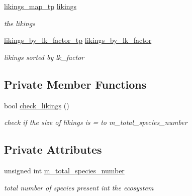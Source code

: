 \begin{DoxyCompactItemize}
\hyperlink{structSpeciesInfo_aa70735bd441c2465b36bef55cfabb1bf}{likings\_\-map\_\-tp} \hyperlink{structSpeciesInfo_a109b3e5acaf126bb8df9648b6c925542}{likings}
\begin{DoxyCompactList}\small\item\em the likings \end{DoxyCompactList}\item 
\hyperlink{structSpeciesInfo_aab6fabec09f9eb5a26e680d1d6f9d037}{likings\_\-by\_\-lk\_\-factor\_\-tp} \hyperlink{structSpeciesInfo_aa9502c5929b33379cefa95ec0f2ba7d7}{likings\_\-by\_\-lk\_\-factor}
\begin{DoxyCompactList}\small\item\em likings sorted by lk\_\-factor \end{DoxyCompactList}\end{DoxyCompactItemize}
\subsection*{Private Member Functions}
\begin{DoxyCompactItemize}
\item 
\hypertarget{structSpeciesInfo_a1ea4e2318d5f8195bf8a53bf3ade3830}{
bool \hyperlink{structSpeciesInfo_a1ea4e2318d5f8195bf8a53bf3ade3830}{check\_\-likings} ()}
\label{structSpeciesInfo_a1ea4e2318d5f8195bf8a53bf3ade3830}

\begin{DoxyCompactList}\small\item\em check if the size of likings is = to m\_\-total\_\-species\_\-number \end{DoxyCompactList}\end{DoxyCompactItemize}
\subsection*{Private Attributes}
\begin{DoxyCompactItemize}
\item 
unsigned int \hyperlink{structSpeciesInfo_a7b4393176e686a4c1b9e22a5e718744c}{m\_\-total\_\-species\_\-number}
\begin{DoxyCompactList}\small\item\em total number of species present int the ecosystem \end{DoxyCompactList}\end{DoxyCompactItemize}
